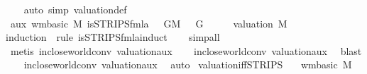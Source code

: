 \begin{isabellebody}
\ \ \isamarkupfalse%
\ {\isacharparenleft}{\kern0pt}auto\ simp{\isacharcolon}{\kern0pt}\ valuation{\isacharunderscore}{\kern0pt}def{\isacharparenright}{\kern0pt}%
\endisatagproof
{\isafoldproof}%
%
\isadelimproof
\isanewline
%
\endisadelimproof
\isanewline
{}\isamarkupfalse%
\ aux{}{\isacharcolon}{\kern0pt}\ {\isachardoublequoteopen}{\isasymlbrakk}wm{\isacharunderscore}{\kern0pt}basic\ M{\isacharsemicolon}{\kern0pt}\ is{\isacharunderscore}{\kern0pt}STRIPS{\isacharunderscore}{\kern0pt}fmla\ {\isasymphi}{\isacharsemicolon}{\kern0pt}\ {\isasymforall}{\isasymA}{\isachardot}{\kern0pt}\ {\isacharparenleft}{\kern0pt}{\isasymforall}G{\isasymin}M{\isachardot}{\kern0pt}\ {\isasymA}\ {\isasymTurnstile}\ G{\isacharparenright}{\kern0pt}\ {\isasymlongrightarrow}\ {\isasymA}\ {\isasymTurnstile}\ {\isasymphi}{\isasymrbrakk}\ {\isasymLongrightarrow}\ valuation\ M\ {\isasymTurnstile}\ {\isasymphi}{\isachardoublequoteclose}\isanewline
%
\isadelimproof
\ \ %
\endisadelimproof
%
\isatagproof
{}\isamarkupfalse%
{\isacharparenleft}{\kern0pt}induction\ {\isasymphi}\ rule{\isacharcolon}{\kern0pt}\ is{\isacharunderscore}{\kern0pt}STRIPS{\isacharunderscore}{\kern0pt}fmla{\isachardot}{\kern0pt}induct{\isacharparenright}{\kern0pt}\isanewline
\ \ \isamarkupfalse%
\ simp{\isacharunderscore}{\kern0pt}all\isanewline
\ \ \isamarkupfalse%
\ {\isacharparenleft}{\kern0pt}metis\ in{\isacharunderscore}{\kern0pt}close{\isacharunderscore}{\kern0pt}world{\isacharunderscore}{\kern0pt}conv\ valuation{\isacharunderscore}{\kern0pt}aux{\isacharunderscore}{\kern0pt}{}{\isacharparenright}{\kern0pt}\isanewline
\ \ \isamarkupfalse%
\ in{\isacharunderscore}{\kern0pt}close{\isacharunderscore}{\kern0pt}world{\isacharunderscore}{\kern0pt}conv\ valuation{\isacharunderscore}{\kern0pt}aux{\isacharunderscore}{\kern0pt}{}\ \isamarkupfalse%
\ blast\isanewline
\ \ \isamarkupfalse%
\ in{\isacharunderscore}{\kern0pt}close{\isacharunderscore}{\kern0pt}world{\isacharunderscore}{\kern0pt}conv\ valuation{\isacharunderscore}{\kern0pt}aux{\isacharunderscore}{\kern0pt}{}\ \isamarkupfalse%
\ auto%
\endisatagproof
{\isafoldproof}%
%
\isadelimproof
\isanewline
%
\endisadelimproof
\isanewline
\isanewline
{}\isamarkupfalse%
\ valuation{\isacharunderscore}{\kern0pt}iff{\isacharunderscore}{\kern0pt}STRIPS{\isacharcolon}{\kern0pt}\isanewline
\ \ \ {\isachardoublequoteopen}wm{\isacharunderscore}{\kern0pt}basic\ M{\isachardoublequoteclose}\isanewline

\end{isabellebody}
